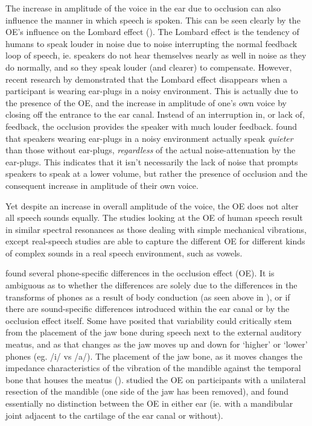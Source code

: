 The increase in amplitude of the voice in the ear due to occlusion can also influence the manner in which speech is spoken.  This can be seen clearly by the OE's influence on the Lombard effect (\cite{lombard:11,lane:71}).  The Lombard effect is the tendency of humans to speak louder in noise due to noise interrupting the normal feedback loop of speech, ie. speakers do not hear themselves nearly as well in noise as they do normally, and so they speak louder (and clearer) to compensate.  However, recent research by \cite{brungart:12} demonstrated that the Lombard effect disappears when a participant is wearing ear-plugs in a noisy environment.  This is actually due to the presence of the OE, and the increase in amplitude of one's own voice by closing off the entrance to the ear canal.  Instead of an interruption in, or lack of, feedback, the occlusion provides the speaker with much louder feedback.  \cite{brungart:12} found that speakers wearing ear-plugs in a noisy environment actually speak \textit{quieter} than those without ear-plugs, \textit{regardless} of the actual noise-attenuation by the ear-plugs.  This indicates that it isn't necessarily the lack of noise that prompts speakers to speak at a lower volume, but rather the presence of occlusion and the consequent increase in amplitude of their own voice.

Yet despite an increase in overall amplitude of the voice, the OE does not alter all speech sounds equally.  The studies looking at the OE of human speech result in similar spectral resonances as those dealing with simple mechanical vibrations, except real-speech studies are able to capture the different OE for different kinds of complex sounds in a real speech environment, such as vowels.  



\cite{hansen:97b} found several phone-specific differences in the occlusion effect (OE). It is ambiguous as to whether the differences are solely due to the differences in the transforms of phones as a result of body conduction (as seen above in \cite{reinfeldt:10}), or if there are sound-specific differences introduced within the ear canal or by the occlusion effect itself.  
Some have posited that variability could critically stem from the placement of the jaw bone during speech next to the external auditory meatus, and as that changes as the jaw moves up and down for `higher' or `lower' phones (eg. /i/ vs /a/). The placement of the jaw bone, as it moves changes the impedance characteristics of the vibration of the mandible against the temporal bone that houses the meatus (\cite{bekesy:60}).  \cite{allen:60} studied the OE on participants with a unilateral resection of the mandible (one side of the jaw has been removed), and found essentially no distinction between the OE in either ear (ie. with a mandibular joint adjacent to the cartilage of the ear canal or without).

